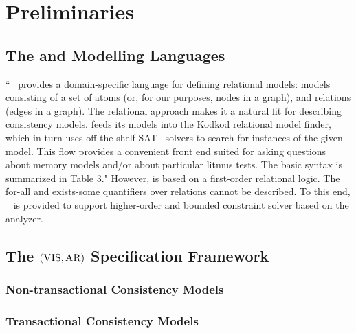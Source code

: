 
\section{Preliminaries}  \label{section:preliminaries}

\subsection{The \alloy{} and \alloystar{} Modelling Languages} \label{ss:alloy}

``\alloy{}~\cite{Alloy:2012} provides a domain-specific language for defining relational models: 
models consisting of a set of atoms (or, for our purposes, nodes in a graph), 
and relations (edges in a graph). 
The relational approach makes it a natural fit 
for describing consistency models.
\alloy{} feeds its models into the Kodkod relational model finder,
which in turn uses off-the-shelf SAT~\cite{} solvers to 
search for instances of the given model. 
This flow provides a convenient front end 
suited for asking questions about 
memory models and/or about particular litmus tests. 
The basic \alloy{} syntax is summarized in Table 3." 
However, \alloy{} is based on a first-order relational logic.
The for-all and exists-some quantifiers over relations cannot be described.
To this end, \alloystar{}~\cite{AlloyStar:ICSE2015} is provided to
support higher-order and bounded constraint solver based on the \alloy{} analyzer.
\subsection{The $(\textsc{VIS}, \textsc{AR})$ Specification Framework} \label{ss:vis-ar}

\subsubsection{Non-transactional Consistency Models} \label{sss:non-tcm}

\subsubsection{Transactional Consistency Models} \label{sss:tcm}

